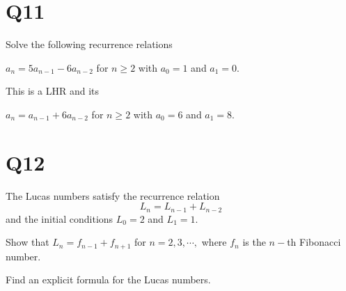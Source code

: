 \documentclass[11pt]{article}
\begin{document}
\section*{Q11}
Solve the following recurrence relations
\begin{qparts}
    
    \item $a_n=5a_{n-1}-6a_{n-2}$ for $n\ge 2$ with $a_0=1$ and $a_1=0$.
    \begin{solution}
        This is a LHR and its 
    \end{solution}
    \item $a_n=a_{n-1}+6a_{n-2}$ for $n\ge 2$ with $a_0=6$ and $a_1=8$.
    
\end{qparts}

\section*{Q12}

The Lucas numbers satisfy the recurrence relation
\[L_n = L_{n-1} + L_{n-2}\]
and the initial conditions $L_0 = 2$ and $L_1 = 1.$
\begin{qparts}
\item Show that $L_n = f_{n-1} + f_{n+1}$ for $n = 2, 3, \cdots ,$
where $f_n$ is the $n-$th Fibonacci number.

\item Find an explicit formula for the Lucas numbers.
\end{qparts}
\end{document}
